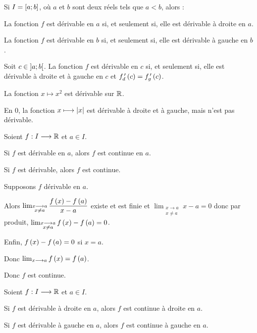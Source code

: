 \begin{rem}
Si \(I=\left[a;b\right]\), où \(a\) et \(b\) sont deux réels tels que \(a<b\), alors :

La fonction \(f\) est dérivable en \(a\) si, et seulement si, elle est dérivable à droite en \(a\).

La fonction \(f\) est dérivable en \(b\) si, et seulement si, elle est dérivable à gauche en \(b\).

Soit \(c\in\left]a;b\right[\). La fonction \(f\) est dérivable en \(c\) si, et seulement si, elle est dérivable à droite et à gauche en \(c\) et \(f_d^{\,\prime}\left(c\right)=f_g^{\,\prime}\left(c\right)\).
\end{rem}

\begin{ex}
La fonction  \(x\mapsto x^2\) est dérivable sur \(\mathbb{R}\).

En \(0\), la fonction  \(x\longmapsto\left\lvert x\right\rvert\) est dérivable à droite et à gauche, mais n'est pas dérivable.
\end{ex}

\begin{prop}
Soient \(f:I\longrightarrow\mathbb{R}\) et \(a\in I\).

Si \(f\) est dérivable en \(a\), alors \(f\) est continue en \(a\).

Si \(f\) est dérivable, alors \(f\) est continue.
\end{prop}

\begin{dem}
Supposons \(f\) dérivable en \(a\).

Alors \(\lim_{\substack{x\longrightarrow a \\ x\not=a}}\dfrac{f\left(x\right)-f\left(a\right)}{x-a}\) existe et est finie et \(\lim_{\substack{x\to a \\ x\not=a}}x-a=0\) donc par produit, \(\lim_{\substack{x\longrightarrow a \\ x\not=a}}f\left(x\right)-f\left(a\right)=0\).

Enfin, \(f\left(x\right)-f\left(a\right)=0\) si \(x=a\).

Donc \(\lim_{x\longrightarrow a}f\left(x\right)=f\left(a\right)\).

Donc \(f\) est continue.
\end{dem}

\begin{rem}
Soient \(f:I\longrightarrow\mathbb{R}\) et \(a\in I\).

Si \(f\) est dérivable à droite en \(a\), alors \(f\) est continue à droite en \(a\).

Si \(f\) est dérivable à gauche en \(a\), alors \(f\) est continue à gauche en \(a\).
\end{rem}

